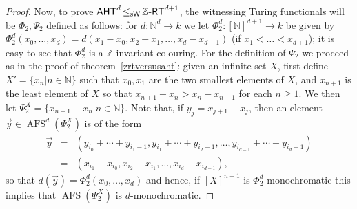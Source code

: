 \documentclass[10pt,a4paper]{amsart}
\DeclareMathOperator{\afs}{AFS}
\newcommand{\aht}{\mathnormal{\mathsf{AHT}}}
\newcommand{\weisleq}{\mathop{\leq_{\mathrm{s}\mathsf{W}}}}
\newcommand{\zrt}{\mathnormal{\mathbb Z\text{-}\mathsf{RT}}}
\begin{document}
\begin{proof}
Now, to prove $\aht^d\weisleq\zrt^{d+1}$, the witnessing Turing functionals will be $\Phi_2,\Psi_2$ defined as follows: for $d:\mathbb N^d\longrightarrow k$ we let $\Phi_2^d:[\mathbb N]^{d+1}\longrightarrow k$ be given by $\Phi_2^d(x_0,\ldots,x_d)=d(x_1-x_0,x_2-x_1,\ldots,x_d-x_{d-1})$ (if $x_1<\ldots<x_{d+1}$); it is easy to see that $\Phi_2^d$ is a $\mathbb Z$-invariant colouring. For the definition of $\Psi_2$ we proceed as in the proof of theorem~\ref{zrtversusaht}: given an infinite set $X$, first define $X'=\{x_n\big|n\in\mathbb N\}$ such that $x_0,x_1$ are the two smallest elements of $X$, and $x_{n+1}$ is the least element of $X$ so that $x_{n+1}-x_n>x_n-x_{n-1}$ for each $n\geq 1$. We then let $\Psi_2^X=\{x_{n+1}-x_n\big|n\in\mathbb N\}$. Note that, if $y_j=x_{j+1}-x_j$, then an element $\vec{y}\in\afs^d(\Psi_2^X)$ is of the form
\begin{eqnarray*}
\vec{y} & = & (y_{i_0}+\cdots+y_{i_{1}-1},y_{i_1}+\cdots+y_{i_2-1},\ldots,y_{i_{d-1}}+\cdots+y_{i_d-1}) \\
& = & (x_{i_1}-x_{i_0},x_{i_2}-x_{i_1},\ldots,x_{i_d}-x_{i_{d-1}}), 
\end{eqnarray*}
so that $d(\vec{y})=\Phi_2^d(x_0,\ldots,x_d)$ and hence, if $[X]^{n+1}$ is $\Phi_2^d$-monochromatic this implies that $\afs(\Psi_2^X)$ is $d$-monochromatic.
\end{proof}
\end{document}
